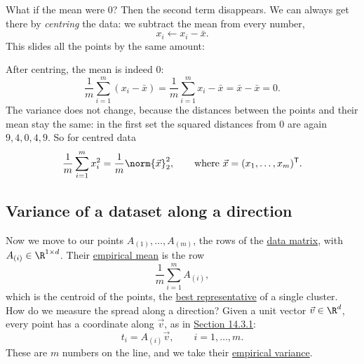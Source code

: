 \documentclass[a4paper,12pt,oneside]{report}
\begin{document}
\label{sec:centring}What if the mean were $0$? Then the second term disappears. We can
always get there by \emph{centring} the data: we subtract the mean
from every number,
\[
  x_i\gets x_i-\bar x .
\]
This slides all the points by the same amount:
\begin{center}
\end{center}
After centring, the mean is indeed $0$:
\[
  \frac1m\sum_{i=1}^{m}(x_i-\bar x)=\frac1m\sum_{i=1}^{m}x_i-\bar x
  =\bar x-\bar x=0 .
\]
The variance does not change, because the distances between the
points and their mean stay the same: in the first set the squared
distances from $0$ are again $9,4,0,4,9$. So for centred data
\[
  \frac1m\sum_{i=1}^{m}x_i^2=\frac1m\norm{\vec x}_2^2,
  \qquad\text{where } \vec x=(x_1,\ldots,x_m)^{\mathsf T}.
\]

\subsection{Variance of a dataset along a direction}
\label{sec:variance-dataset-direction}

Now we move to our points $A_{(1)},\ldots,A_{(m)}$, the rows of the
\hyperref[sec:data-matrix]{data matrix}, with $A_{(i)}\in\R^{1\times d}$.
Their \hyperref[def:empirical-mean]{empirical mean} is the row
\[
  \frac1m\sum_{i=1}^{m}A_{(i)},
\]
which is the centroid of the points, the
\hyperref[prop:k-means-one]{best representative} of a single cluster.
How do we measure the spread along a direction? Given a unit vector
$\vec v\in\R^d$, every point has a coordinate along $\vec v$, as in
\hyperref[sec:project-data-matrix]{Section 14.3.1}:
\[
  t_i=A_{(i)}\vec v,\qquad i=1,\ldots,m .
\]
These are $m$ numbers on the line, and we take their
\hyperref[def:empirical-variance]{empirical variance}.
\end{document}

